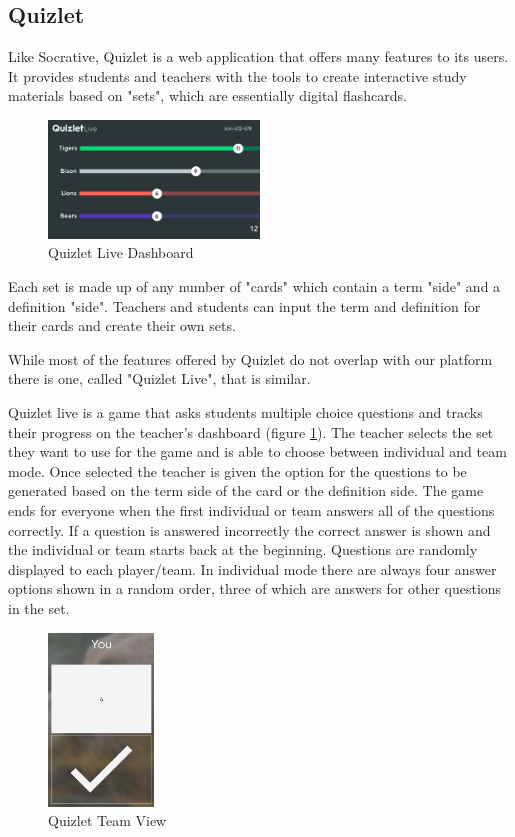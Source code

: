 \documentclass{article}
\begin{document}
\subsection{Quizlet}
Like Socrative, Quizlet is a web application that offers many features to its users. It provides students and teachers with the tools to create interactive study materials based on "sets", which are essentially digital flashcards.
\begin{figure}
    \centering
    \includegraphics[width=0.5\textwidth]{images/quizlet-live.png}
    \caption{Quizlet Live Dashboard \cite{quizlet}}
    \label{fig:quizlet-live}
\end{figure}
Each set is made up of any number of "cards" which contain a term "side" and a definition "side". Teachers and students can input the term and definition for their cards and create their own sets.

While most of the features offered by Quizlet do not overlap with our platform there is one, called "Quizlet Live", that is similar.

Quizlet live is a game that asks students multiple choice questions and tracks their progress on the teacher's dashboard (figure \ref{fig:quizlet-live}). The teacher selects the set they want to use for the game and is able to choose between individual and team mode. Once selected the teacher is given the option for the questions to be generated based on the term side of the card or the definition side. The game ends for everyone when the first individual or team answers all of the questions correctly. If a question is answered incorrectly the correct answer is shown and the individual or team starts back at the beginning. Questions are randomly displayed to each player/team. In individual mode there are always four answer options shown in a random order, three of which are answers for other questions in the set.

\begin{figure}
    \centering
    \includegraphics[width=0.25\textwidth]{images/quizlet-team.png}
    \caption{Quizlet Team View \cite{quizlet}}
    \label{fig:quizlet-team}
\end{figure}
\end{document}
